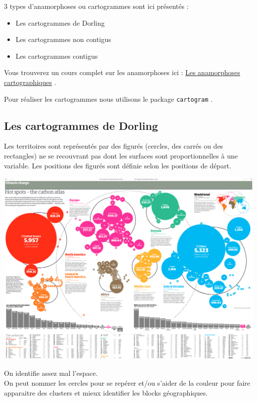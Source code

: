 \documentclass[]{book}
\providecommand{\tightlist}{%
  \setlength{\itemsep}{0pt}\setlength{\parskip}{0pt}}
\let\BeginKnitrBlock\begin \let\EndKnitrBlock\end
\begin{document}
3 types d'anamorphoses ou cartogrammes sont ici présentés :

\begin{itemize}
\tightlist
\item
  Les cartogrammes de Dorling \citep{Dorling96}
\item
  Les cartogrammes non contigus \citep{Olson76}
\item
  Les cartogrammes contigus \citep{Dougenik85}
\end{itemize}

Vous trouverez un cours complet sur les anamorphoses ici :
\href{https://neocarto.hypotheses.org/366}{Les anamorphoses
cartographiques} \citep{Lambert15}.

Pour réaliser les cartogrammes nous utilisons le package
\texttt{cartogram} \citep{R-cartogram}.

\subsection{Les cartogrammes de
Dorling}\label{les-cartogrammes-de-dorling}

Les territoires sont représentés par des figurés (cercles, des carrés ou
des rectangles) ne se recouvrant pas dont les surfaces sont
proportionnelles à une variable. Les positions des figurés sont définie
selon les positions de départ.

\begin{center}\includegraphics[width=16.74in]{img/dorling} \end{center}

\citep{McCormick07}

\BeginKnitrBlock{rmdmoins}
On identifie assez mal l'espace.\\
On peut nommer les cercles pour se repérer et/ou s'aider de la couleur
pour faire apparaitre des clusters et mieux identifier les blocks
géographiques.
\EndKnitrBlock{rmdmoins}
\end{document}
